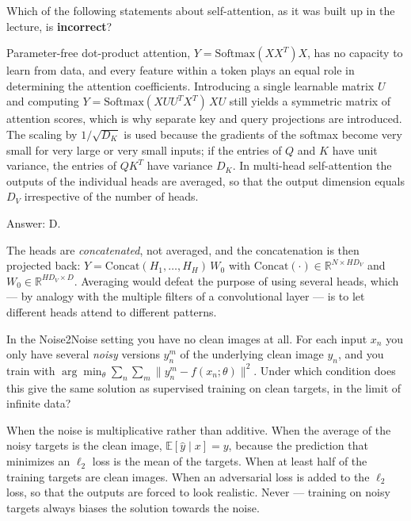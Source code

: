 \documentclass[11pt]{exam}
\begin{document}
\begin{questions}
\question
Which of the following statements about self-attention, as it was built up in the lecture, is
\textbf{incorrect}?

\begin{choices}
  \choice Parameter-free dot-product attention, $Y = \mathrm{Softmax}(XX^T)X$, has no capacity to
  learn from data, and every feature within a token plays an equal role in determining the attention
  coefficients.
  \choice Introducing a single learnable matrix $U$ and computing
  $Y = \mathrm{Softmax}(XUU^TX^T)\,XU$ still yields a symmetric matrix of attention scores, which is
  why separate key and query projections are introduced.
  \choice The scaling by $1/\sqrt{D_K}$ is used because the gradients of the softmax become very
  small for very large or very small inputs; if the entries of $Q$ and $K$ have unit variance, the
  entries of $QK^T$ have variance $D_K$.
  \choice In multi-head self-attention the outputs of the individual heads are averaged, so that the
  output dimension equals $D_V$ irrespective of the number of heads.
\end{choices}

\begin{solution}
  Answer: D.

  The heads are \emph{concatenated}, not averaged, and the concatenation is then projected back:
  $Y = \mathrm{Concat}(H_1, \dots, H_H)\,W_0$ with
  $\mathrm{Concat}(\cdot) \in \mathbb{R}^{N \times H D_V}$ and $W_0 \in \mathbb{R}^{H D_V \times D}$.
  Averaging would defeat the purpose of using several heads, which --- by analogy with the multiple
  filters of a convolutional layer --- is to let different heads attend to different patterns.
\end{solution}

\question
In the Noise2Noise setting you have no clean images at all. For each input $x_n$ you only have
several \emph{noisy} versions $y_n^m$ of the underlying clean image $y_n$, and you train with
$\arg\min_\theta \sum_n \sum_m \|y_n^m - f(x_n;\theta)\|^2$. Under which condition does this give
the same solution as supervised training on clean targets, in the limit of infinite data?

\begin{choices}
  \choice When the noise is multiplicative rather than additive.
  \choice When the average of the noisy targets is the clean image, $\mathbb{E}[\hat y \mid x] = y$,
  because the prediction that minimizes an $\ell_2$ loss is the mean of the targets.
  \choice When at least half of the training targets are clean images.
  \choice When an adversarial loss is added to the $\ell_2$ loss, so that the outputs are forced to
  look realistic.
  \choice Never --- training on noisy targets always biases the solution towards the noise.
\end{choices}


\end{questions}
\end{document}
